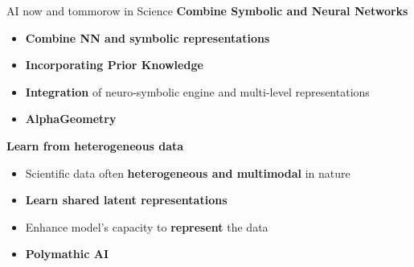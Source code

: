 \begin{frame}{AI now and tommorow in Science}
  \textbf{Combine Symbolic and Neural Networks} 
    \begin{itemize}
      \item \textbf{Combine NN and symbolic representations} 
      \item \textbf{Incorporating Prior Knowledge} 
      \item \textbf{Integration} of neuro-symbolic engine and multi-level representations
      \item \textbf{AlphaGeometry}
    \end{itemize}
  
  \textbf{Learn from heterogeneous data}
  \begin{itemize}
    \item Scientific data often \textbf{heterogeneous and multimodal} in nature
    \item \textbf{Learn shared latent representations}
    \item Enhance model's capacity to \textbf{represent} the data
    \item \textbf{Polymathic AI}
  \end{itemize}  


\end{frame}
